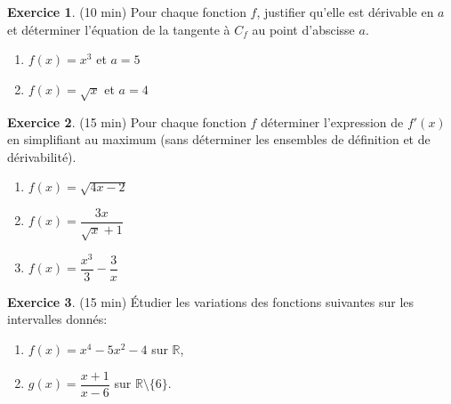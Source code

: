 \documentclass{exam}
\theoremstyle{definition}
\newtheorem{exercice}{Exercice}
\begin{document}
\begin{exercice}{(10 min)}
    Pour chaque fonction $f$, justifier qu’elle est dérivable en $a$ et déterminer l’équation de la tangente à $C_f$ au point d’abscisse $a$.
    \begin{enumerate}
        \item $f(x) = x^3$ et $a = 5$
        \item $f(x) = \sqrt{x}$ et $a = 4$
    \end{enumerate}
    \end{exercice}
    
    \begin{exercice}{(15 min)}
    Pour chaque fonction $f$ déterminer l'expression de $f'(x)$ en simplifiant au maximum (sans déterminer les ensembles de définition et de dérivabilité).
    \begin{enumerate}
        \item $f(x) = \sqrt{4x - 2}$
        \item $f(x) = \dfrac{3x}{\sqrt{x} + 1}$
        \item $f(x) = \dfrac{x^3}{3} - \dfrac{3}{x}$
    \end{enumerate}
    \end{exercice}
\begin{exercice}{(15 min)}
Étudier les variations des fonctions suivantes sur les intervalles donnés:
\begin{enumerate}
    \item $f(x) = x^4 - 5x^2 - 4$ sur $\mathbb{R}$,
    \item $g(x) = \dfrac{x+1}{x-6}$ sur $\mathbb{R} \setminus \{6\}$.
\end{enumerate}
\end{exercice}
\end{document}
